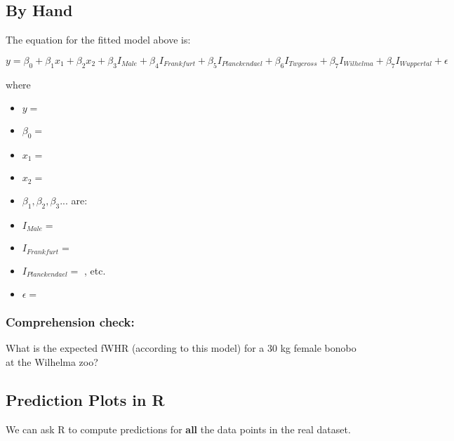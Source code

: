 \documentclass[]{book}
\newenvironment{Shaded}{\begin{snugshade}}{\end{snugshade}}
\newcommand{\DataTypeTok}[1]{\textcolor[rgb]{0.13,0.29,0.53}{#1}}
\newcommand{\KeywordTok}[1]{\textcolor[rgb]{0.13,0.29,0.53}{\textbf{#1}}}
\newcommand{\NormalTok}[1]{#1}
\newcommand{\OperatorTok}[1]{\textcolor[rgb]{0.81,0.36,0.00}{\textbf{#1}}}
\newcommand{\StringTok}[1]{\textcolor[rgb]{0.31,0.60,0.02}{#1}}
\providecommand{\tightlist}{%
  \setlength{\itemsep}{0pt}\setlength{\parskip}{0pt}}
\begin{document}
\hypertarget{by-hand}{%
\subsection{By Hand}\label{by-hand}}

The equation for the fitted model above is:

\[ y = \beta_0 + \beta_1x_1 + \beta_2x_2 + \beta_3I_{Male} + \beta_4I_{Frankfurt} + \beta_5I_{Planckendael} + \beta_6I_{Twycross} + \beta_7I_{Wilhelma} + \beta_7I_{Wuppertal} + \epsilon\]

where

\begin{itemize}
\tightlist
\item
  \(y =\)
\item
  \(\beta_0=\)
\end{itemize}

\begin{itemize}
\tightlist
\item
  \(x_1=\)
\item
  \(x_2=\)
\item
  \(\beta_1, \beta_2, \beta_3 ...\) are:
\item
  \(I_{Male} =\)
\item
  \(I_{Frankfurt} =\)
\item
  \(I_{Planckendael} =\) \hspace{3in}, etc.
\item
  \(\epsilon=\)
\end{itemize}

\hypertarget{comprehension-check}{%
\subsubsection{Comprehension check:}\label{comprehension-check}}

What is the expected fWHR (according to this model) for a 30 kg female bonobo at the Wilhelma zoo?

\hypertarget{prediction-plots-in-r}{%
\subsection{Prediction Plots in R}\label{prediction-plots-in-r}}

We can ask R to compute predictions for \textbf{all} the data points in the real dataset.

\begin{Shaded}
\end{Shaded}
\end{document}
